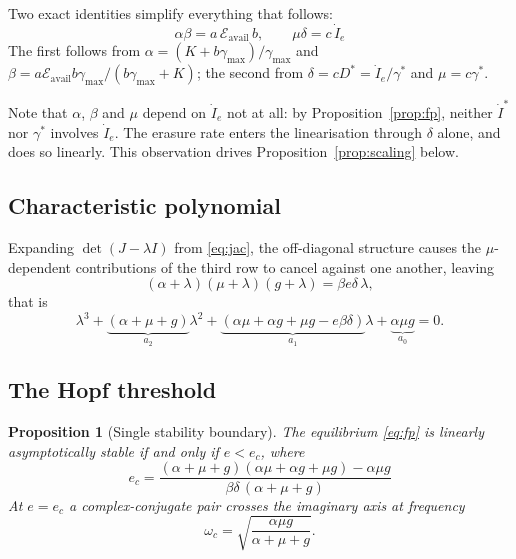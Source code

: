 \documentclass[11pt,a4paper]{article}
\newtheorem{proposition}{Proposition}
\theoremstyle{definition}
\begin{document}
Two exact identities simplify everything that follows:
\begin{equation}
\boxed{\;\alpha\beta=a\,\mathcal{E}_{\text{avail}}\,b,
\qquad
\mu\delta=c\,\dot I_e\;}
\label{eq:ident}
\end{equation}
The first follows from
$\alpha=(K+b\gamma_{\max})/\gamma_{\max}$ and
$\beta=a\mathcal{E}_{\text{avail}}b\gamma_{\max}/(b\gamma_{\max}+K)$; the
second from $\delta=cD^{*}=\dot I_e/\gamma^{*}$ and $\mu=c\gamma^{*}$.

Note that $\alpha$, $\beta$ and $\mu$ depend on $\dot I_e$ not at all: by
Proposition~\ref{prop:fp}, neither $\dot I^{*}$ nor $\gamma^{*}$ involves
$\dot I_e$. The erasure rate enters the linearisation through $\delta$ alone,
and does so linearly. This observation drives Proposition~\ref{prop:scaling}
below.

\subsection{Characteristic polynomial}

Expanding $\det(J-\lambda I)$ from \eqref{eq:jac}, the off-diagonal
structure causes the $\mu$-dependent contributions of the third row to cancel
against one another, leaving
\begin{equation}
(\alpha+\lambda)(\mu+\lambda)(g+\lambda)=\beta e\delta\,\lambda,
\end{equation}
that is
\begin{equation}
\lambda^{3}
+\underbrace{(\alpha+\mu+g)}_{a_2}\lambda^{2}
+\underbrace{(\alpha\mu+\alpha g+\mu g-e\beta\delta)}_{a_1}\lambda
+\underbrace{\alpha\mu g}_{a_0}=0 .
\label{eq:cubic}
\end{equation}

\subsection{The Hopf threshold}

\begin{proposition}[Single stability boundary]
\label{prop:hopf}
The equilibrium \eqref{eq:fp} is linearly asymptotically stable if and only if
$e<e_c$, where
\begin{equation}
\boxed{\;
e_c=\frac{(\alpha+\mu+g)(\alpha\mu+\alpha g+\mu g)-\alpha\mu g}
{\beta\delta\,(\alpha+\mu+g)}\;}
\label{eq:ecrit}
\end{equation}
At $e=e_c$ a complex-conjugate pair crosses the imaginary axis at frequency
\begin{equation}
\omega_c=\sqrt{\frac{\alpha\mu g}{\alpha+\mu+g}} .
\label{eq:omega}
\end{equation}
\end{proposition}
\end{document}
